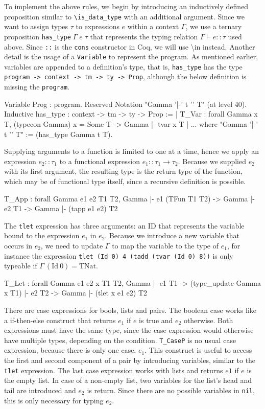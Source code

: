 \documentclass[fleqn]{scrreprt}
\newcommand{\todo}[1]{\marginpar{\textbf{TODO:} #1}}
\newcommand{\coqinline}[1]{\texttt{#1}}
\begin{document}
\par \todo{Redundanzen entfernen}
To implement the above rules, we begin by introducing an inductively defined proposition similar to \texttt{\textbackslash is\_data\_type} with an additional argument. Since we want to assign types $\tau$ to expressions $e$ within a context $\Gamma$, we use a ternary proposition \coqinline{has_type}$\; \Gamma \; e \; \tau$ that represents the typing relation $\Gamma \vdash e :: \tau$ used above. Since \coqinline{::} is the \coqinline{cons} constructor in Coq, we will use \textbackslash in instead. Another detail is the usage of a \coqinline{Variable} to represent the program. As mentioned earlier, variables are appended to a definition's type, that is, \coqinline{has_type} has the type \coqinline{program -> context -> tm -> ty -> Prop}, although the below definition is missing the \coqinline{program}.
\begin{coqcode}
Variable Prog : program.
Reserved Notation "Gamma '|-' t '\in' T" (at level 40).
Inductive has_type : context -> tm -> ty -> Prop :=
  | T_Var : forall Gamma x T, (typecon Gamma) x = Some T ->
              Gamma |- tvar x \in T
  | ...
where "Gamma '|-' t '\in' T" := (has_type Gamma t T).
\end{coqcode}
Supplying arguments to a function is limited to one at a time, hence we apply an expression $e_{2} :: \tau_{1}$ to a functional expression $e_{1} :: \tau_{1} \rightarrow \tau_{2}$. Because we supplied $e_{2}$ with its first argument, the resulting type is the return type of the function, which may be of functional type itself, since a recursive definition is possible.
\begin{coqcode}
T_App : forall Gamma e1 e2 T1 T2,
          Gamma |- e1 \in (TFun T1 T2) -> Gamma |- e2 \in T1 ->
          Gamma |- (tapp e1 e2) \in T2
\end{coqcode}
The \coqinline{tlet} expression has three arguments: an ID that represents the variable bound to the expression $e_{1}$ in $e_{2}$. Because we introduce a new variable that occurs in $e_{2}$, we need to update $\Gamma$ to map the variable to the type of $e_{1}$, for instance the expression \coqinline{tlet (Id 0) 4 (tadd (tvar (Id 0) 8))} is only typeable if $\Gamma \:(\text{Id}\: 0) = \text{TNat}$.
\begin{coqcode}
T_Let : forall Gamma e1 e2 x T1 T2,
          Gamma |- e1 \in T1 -> (type_update Gamma x T1) |- e2 \in T2 ->
          Gamma |- (tlet x e1 e2) \in T2
\end{coqcode}
There are case expressions for bools, lists and pairs. The boolean case works like a if-then-else construct that returns $e_{1}$ if $e$ is true and $e_{2}$ otherwise. Both expressions must have the same type, since the case expression would otherwise have multiple types, depending on the condition. \coqinline{T_CaseP} is no usual case expression, because there is only one case, $e_{1}$. This construct is useful to access the first and second component of a pair by introducing variables, similar to the \coqinline{tlet} expression. The last case expression works with lists and returns $e1$ if $e$ is the empty list. In case of a non-empty list, two variables for the list's head and tail are introduced and $e_{2}$ is return. Since there are no possible variables in \coqinline{nil}, this is only necessary for typing $e_{2}$.
\end{document}
